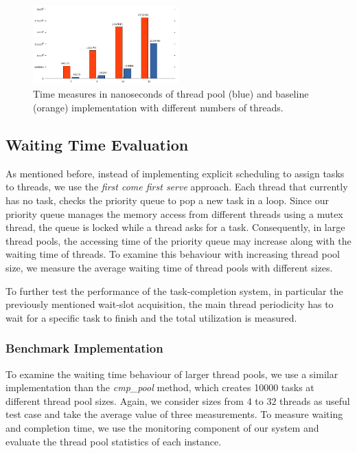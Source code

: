 \documentclass[conference]{IEEEtran}
\begin{document}
\begin{figure}
	\includegraphics[width=0.5\textwidth]{img/pool_baseline.png}
	\caption{Time measures in nanoseconds of thread pool (blue) and baseline (orange) implementation with different numbers of threads.  }
	\label{fig6}
\end{figure}

\subsection{Waiting Time Evaluation}
As mentioned before, instead of implementing explicit scheduling to assign tasks to threads, we use the \emph{first come first serve} approach. Each thread that currently has no task, checks the priority queue to pop a new task in a loop. Since our priority queue manages the memory access from different threads using a mutex thread, the queue is locked while a thread asks for a task. Consequently, in large thread pools, the accessing time of the priority queue may increase along with the waiting time of threads. To examine this behaviour with increasing thread pool size, we measure the average waiting time of thread pools with different sizes.

To further test the performance of the task-completion system, in particular the previously mentioned wait-slot acquisition, the main thread periodicity has to wait for a specific task to finish and the total utilization is measured.

\subsubsection{Benchmark Implementation}
To examine the waiting time behaviour of larger thread pools, we use a similar implementation than the \emph{cmp\_pool} method, which creates 10000 tasks at different thread pool sizes. Again, we consider sizes from $4$ to $32$ threads as useful test case and take the average value of three measurements. To measure waiting and completion time, we use the monitoring component of our system and evaluate the thread pool statistics of each instance. 
\end{document}

